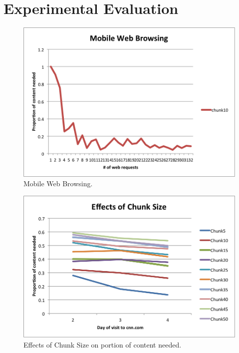 \section{Experimental Evaluation}
\label{sec:eval}


\begin{figure}[h] 
\centering \includegraphics[scale=0.40]{images/browsing.png}
\caption{Mobile Web Browsing.}
\label{fig:mobsim_ui}
\end{figure}

\begin{figure}[h] 
\centering \includegraphics[scale=0.40]{images/chunksize.png}
\caption{Effects of Chunk Size on portion of content needed.}
\label{fig:mobsim_ui}
\end{figure}

